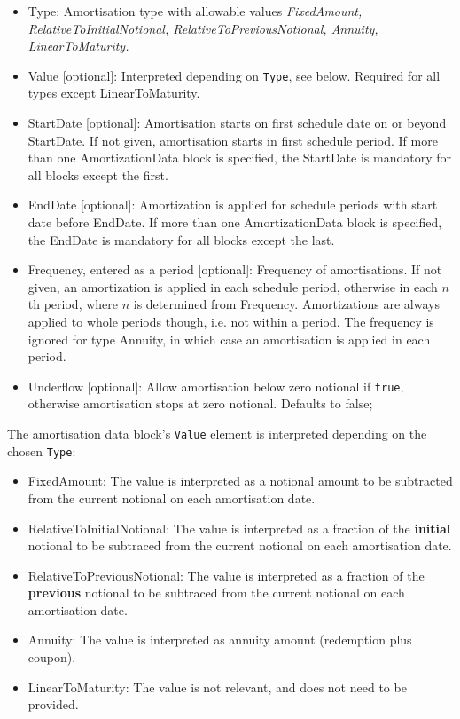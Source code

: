 \begin{itemize}
\item Type: Amortisation type with allowable values {\em FixedAmount, RelativeToInitialNotional,
  RelativeToPreviousNotional, Annuity, LinearToMaturity.}
\item Value [optional]: Interpreted depending on {\tt Type}, see below. Required for all types except LinearToMaturity.
\item StartDate [optional]: Amortisation starts on first schedule date on or beyond StartDate. If not given,
  amortisation starts in first schedule period. If more than one AmortizationData block is specified, the StartDate is
  mandatory for all blocks except the first.
\item EndDate [optional]: Amortization is applied for schedule periods with start date before EndDate. If more than one
  AmortizationData block is specified, the EndDate is mandatory for all blocks except the last.
\item Frequency, entered as a period [optional]: Frequency of amortisations. If not given, an amortization is applied in
  each schedule period, otherwise in each $n$th period, where $n$ is determined from Frequency. Amortizations are always
  applied to whole periods though, i.e. not within a period. The frequency is ignored for type Annuity, in which case an
  amortisation is applied in each period.
\item Underflow [optional]: Allow amortisation below zero notional if {\tt true}, otherwise amortisation stops at zero
  notional. Defaults to false;
\end{itemize}

The amortisation data block's {\tt Value} element  is interpreted
depending on the chosen {\tt Type}:
\begin{itemize}
\item FixedAmount: The value is interpreted as a notional amount to be
  subtracted from the current notional on each amortisation date.
\item RelativeToInitialNotional: The value is interpreted as a
  fraction of the {\bf initial} notional to be subtraced from the current
  notional on each amortisation date.
\item RelativeToPreviousNotional: The value is interpreted as a
  fraction of the {\bf previous} notional to be subtraced from the current
  notional on each amortisation date.
\item Annuity: The value is interpreted as annuity amount (redemption
  plus coupon).
\item LinearToMaturity: The value is not relevant, and does not need to be provided.
\end{itemize}

